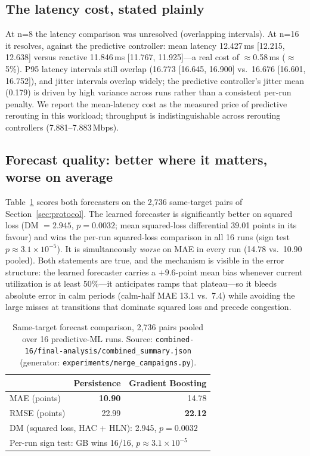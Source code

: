 \documentclass[conference]{IEEEtran}
\begin{document}
\subsection{The latency cost, stated plainly}
At n=8 the latency comparison was unresolved (overlapping intervals).
At n=16 it resolves, against the predictive controller: mean latency
12.427\,ms [12.215, 12.638] versus reactive 11.846\,ms
[11.767, 11.925]---a real cost of $\approx$0.58\,ms ($\approx$5\%).
P95 latency intervals still overlap (16.773 [16.645, 16.900] vs.\
16.676 [16.601, 16.752]), and jitter intervals overlap widely; the
predictive controller's jitter mean (0.179) is driven by high
variance across runs rather than a consistent per-run penalty. We
report the mean-latency cost as the measured price of predictive
rerouting in this workload; throughput is indistinguishable across
rerouting controllers (7.881--7.883\,Mbps).

\subsection{Forecast quality: better where it matters, worse on average}
\label{sec:forecast}
Table~\ref{tab:forecast} scores both forecasters on the 2{,}736
same-target pairs of Section~\ref{sec:protocol}. The learned
forecaster is significantly better on squared loss (DM $= 2.945$,
$p = 0.0032$; mean squared-loss differential 39.01 points in its
favour) and wins the per-run squared-loss comparison in all 16 runs
(sign test $p \approx 3.1 \times 10^{-5}$). It is simultaneously
\emph{worse} on MAE in every run (14.78 vs.\ 10.90 pooled). Both
statements are true, and the mechanism is visible in the error
structure: the learned forecaster carries a $+9.6$-point mean bias
whenever current utilization is at least 50\%---it anticipates ramps
that plateau---so it bleeds absolute error in calm periods (calm-half
MAE 13.1 vs.\ 7.4) while avoiding the large misses at transitions
that dominate squared loss and precede congestion.

\begin{table}[t]
\centering
\caption{Same-target forecast comparison, 2{,}736 pairs pooled over
16 predictive-ML runs. Source:
\texttt{combined-16/final-analysis/combined\_summary.json}
(generator: \texttt{experiments/merge\_campaigns.py}).}
\label{tab:forecast}
\begin{tabular}{lrr}
\toprule
 & Persistence & Gradient Boosting \\
\midrule
MAE (points)  & \textbf{10.90} & 14.78 \\
RMSE (points) & 22.99 & \textbf{22.12} \\
\midrule
\multicolumn{3}{l}{DM (squared loss, HAC + HLN): 2.945, $p = 0.0032$} \\
\multicolumn{3}{l}{Per-run sign test: GB wins 16/16, $p \approx 3.1 \times 10^{-5}$} \\
\bottomrule
\end{tabular}
\end{table}
\end{document}
